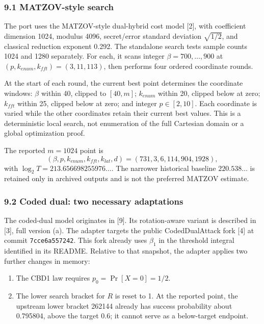 \documentclass[
  10pt,
  a4paper,
]{article}
\providecommand{\tightlist}{%
  \setlength{\itemsep}{0pt}\setlength{\parskip}{0pt}}
\begin{document}
\subsubsection{9.1 MATZOV-style search}\label{matzov-style-search}

The port uses the MATZOV-style dual-hybrid cost model {[}2{]}, with
coefficient dimension 1024, modulus 4096, secret/error standard
deviation \(\sqrt{1/2}\), and classical reduction exponent 0.292. The
standalone search tests sample counts 1024 and 1280 separately. For
each, it scans integer \(\beta=700,\ldots,900\) at
\((p,k_{enum},k_{fft})=(3,11,113)\), then performs four ordered
coordinate rounds.

At the start of each round, the current best point determines the
coordinate windows: \(\beta\) within 40, clipped to \([40,m]\);
\(k_{enum}\) within 20, clipped below at zero; \(k_{fft}\) within 25,
clipped below at zero; and integer \(p\in[2,10]\). Each coordinate is
varied while the other coordinates retain their current best values.
This is a deterministic local search, not enumeration of the full
Cartesian domain or a global optimization proof.

The reported \(m=1024\) point is \[
(\beta,p,k_{enum},k_{fft},k_{lat},d)=(731,3,6,114,904,1928),
\] with \(\log_2 T=213.656698255976\ldots\). The narrower historical
baseline \(220.538\ldots\) is retained only in archived outputs and is
not the preferred MATZOV estimate.

\subsubsection{9.2 Coded dual: two necessary
adaptations}\label{coded-dual-two-necessary-adaptations}

The coded-dual model originates in {[}9{]}. Its rotation-aware variant
is described in {[}3{]}, full version (a). The adapter targets the
public CodedDualAttack fork {[}4{]} at commit \texttt{7cce6a557242}.
This fork already uses \(\beta_1\) in the threshold integral identified
in its README. Relative to that snapshot, the adapter applies two
further changes in memory:

\begin{enumerate}
\def\labelenumi{\arabic{enumi}.}
\tightlist
\item
  The CBD1 law requires \(p_0=\Pr[X=0]=1/2\).
\item
  The lower search bracket for \(R\) is reset to 1. At the reported
  point, the upstream lower bracket 262144 already has success
  probability about 0.795804, above the target 0.6; it cannot serve as a
  below-target endpoint.
\end{enumerate}
\end{document}

